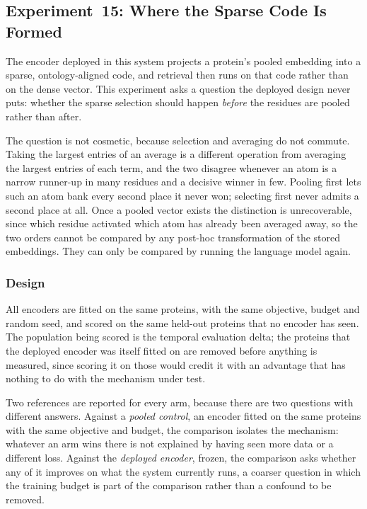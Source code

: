 \subsection{Experiment~15: Where the Sparse Code Is Formed}
\label{sec:exp15-residue-sparse}

The encoder deployed in this system projects a protein's pooled embedding into a
sparse, ontology-aligned code, and retrieval then runs on that code rather than on
the dense vector. This experiment asks a question the deployed design never puts:
whether the sparse selection should happen \emph{before} the residues are pooled
rather than after.

The question is not cosmetic, because selection and averaging do not commute. Taking
the largest entries of an average is a different operation from averaging the largest
entries of each term, and the two disagree whenever an atom is a narrow runner-up in
many residues and a decisive winner in few. Pooling first lets such an atom bank
every second place it never won; selecting first never admits a second place at all.
Once a pooled vector exists the distinction is unrecoverable, since which residue
activated which atom has already been averaged away, so the two orders cannot be
compared by any post-hoc transformation of the stored embeddings. They can only be
compared by running the language model again.

\subsubsection{Design}

All encoders are fitted on the same proteins, with the same objective, budget and
random seed, and scored on the same held-out proteins that no encoder has seen. The
population being scored is the temporal evaluation delta; the proteins that the
deployed encoder was itself fitted on are removed before anything is measured, since
scoring it on those would credit it with an advantage that has nothing to do with the
mechanism under test.

Two references are reported for every arm, because there are two questions with
different answers. Against a \emph{pooled control}, an encoder fitted on the same
proteins with the same objective and budget, the comparison isolates the mechanism:
whatever an arm wins there is not explained by having seen more data or a different
loss. Against the \emph{deployed encoder}, frozen, the comparison asks whether any of
it improves on what the system currently runs, a coarser question in which the
training budget is part of the comparison rather than a confound to be removed.


